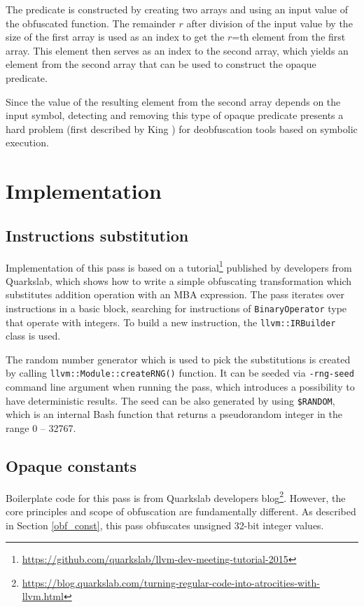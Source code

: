 \documentclass[
  digital, %
  table,   %
  twoside, %
  nolof,     %
  nolot,     %
]{fithesis3}
\theoremstyle{definition}
\begin{document}
The predicate is constructed by creating two arrays and using an input value of the obfuscated function. The remainder $r$ after division of the input value by the size of the first array is used as an index to get the $r$=th element from the first array. This element then serves as an index to the second array, which yields an element from the second array that can be used to construct the opaque predicate. 

Since the value of the resulting element from the second array depends on the input symbol, detecting and removing this type of opaque predicate presents a hard problem (first described by King \cite{King1976}) for deobfuscation tools based on symbolic execution. 

\chapter{Implementation}
\section{Instructions substitution}
Implementation of this pass is based on a tutorial\footnote{\url{https://github.com/quarkslab/llvm-dev-meeting-tutorial-2015}} published by developers from Quarkslab, which shows how to write a simple obfuscating transformation which substitutes addition operation with an MBA expression. 
The pass iterates over instructions in a basic block, searching for instructions of \texttt{BinaryOperator} type that operate with integers. To build a new instruction, the \texttt{llvm::IRBuilder} class is used. 

The random number generator which is used to pick the substitutions is created by calling \texttt{llvm::Module::createRNG()} function. It can be seeded via \texttt{-rng-seed} command line argument when running the pass, which introduces a possibility to have deterministic results. The seed can be also generated by using \texttt{\$RANDOM}, which is an internal Bash function that returns a pseudorandom integer in the range 0 -- 32767.

\section{Opaque constants}
Boilerplate code for this pass is from Quarkslab developers blog\footnote{\url{https://blog.quarkslab.com/turning-regular-code-into-atrocities-with-llvm.html}}. However, the core principles and scope of obfuscation are fundamentally different. As described in Section \ref{obf_const}, this pass obfuscates unsigned 32-bit integer values. 
\end{document}
